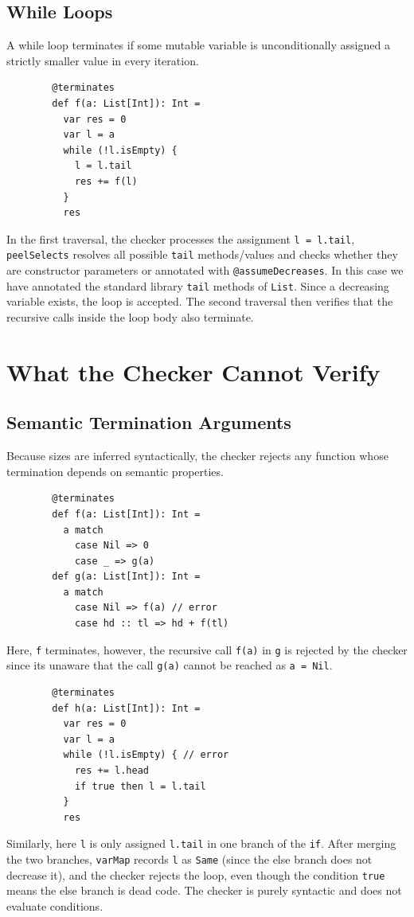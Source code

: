 \subsection{While Loops}
A while loop terminates if some mutable variable is unconditionally assigned a
strictly smaller value in every iteration.
\begin{verbatim}
        @terminates
        def f(a: List[Int]): Int =
          var res = 0
          var l = a
          while (!l.isEmpty) {
            l = l.tail
            res += f(l)
          }
          res
\end{verbatim}
In the first traversal, the checker processes the assignment
\texttt{l = l.tail}, \texttt{peelSelects} resolves all possible \texttt{tail}
methods/values and checks whether they are constructor parameters or annotated
with \texttt{@assumeDecreases}. In this case we have annotated the standard
library \texttt{tail} methods of \texttt{List}. Since a decreasing variable
exists, the loop is accepted. The second traversal then verifies that the
recursive calls inside the loop body also terminate.

\section{What the Checker Cannot Verify}
\subsection{Semantic Termination Arguments}
Because sizes are inferred syntactically, the checker rejects any function whose
termination depends on semantic properties.
\begin{verbatim}
        @terminates
        def f(a: List[Int]): Int =
          a match
            case Nil => 0
            case _ => g(a)
        def g(a: List[Int]): Int =
          a match
            case Nil => f(a) // error
            case hd :: tl => hd + f(tl)
\end{verbatim}
Here, \texttt{f} terminates, however, the recursive call \texttt{f(a)} in
\texttt{g} is rejected by the checker since its unaware that the call
\texttt{g(a)} cannot be reached as \texttt{a = Nil}.

\begin{verbatim}
        @terminates
        def h(a: List[Int]): Int =
          var res = 0
          var l = a
          while (!l.isEmpty) { // error
            res += l.head
            if true then l = l.tail
          }
          res
\end{verbatim}
Similarly, here \texttt{l} is only assigned \texttt{l.tail} in one branch of the
\texttt{if}. After merging the two branches, \texttt{varMap} records \texttt{l}
as \texttt{Same} (since the else branch does not decrease it), and the checker
rejects the loop, even though the condition \texttt{true} means the else branch
is dead code. The checker is purely syntactic and does not evaluate conditions.

